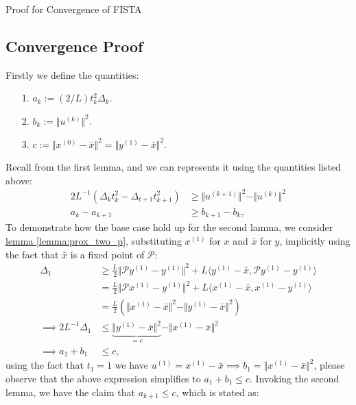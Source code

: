 \documentclass[]{article}
\theoremstyle{definition}
\begin{document}
\begin{section}{Proof for Convergence of FISTA}
    \subsection{Convergence Proof}
        Firstly we define the quantities: 
        \begin{itemize}
            \item [1.] $a_k := (2/L)t_k^2 \Delta_k$.
            \item [2.] $b_k := \Vert u^{(k)}\Vert^2$.
            \item [3.] $c:= \Vert x^{(0)} - \bar x\Vert^2 = \Vert y^{(1)} - \bar x\Vert^2$. 
        \end{itemize}
        Recall from the first lemma, and we can represents it using the quantities listed above: 
        \begin{align*}
            2L^{-1}(\Delta_kt_k^2 - \Delta_{t + 1}t_{k + 1}^2) 
            &\ge 
            \Vert u^{(k + 1)}\Vert^2 - \Vert u^{(k)}\Vert^2
            \\
            a_k - a_{k + 1} &\ge 
            b_{k + 1} - b_k, 
        \end{align*}
        To demonstrate how the base case hold up for the second lamma, we consider \hyperref[lemma:prox_two_p]{lemma \ref*{lemma:prox_two_p}}, substituting $x^{(1)}$ for $x$ and $\bar x$ for $y$, implicitly using the fact that $\bar x$ is a fixed point of $\mathcal P$: 
        \begin{align*}
            \Delta_1& \ge 
            \frac{L}{2}\Vert \mathcal Py^{(1)} - y^{(1)}\Vert^2 + L 
            \langle y^{(1)} - \bar x, \mathcal P y^{(1)} - y^{(1)}\rangle
            \\
            & =
            \frac{L}{2}\Vert \mathcal P x^{(1)} - y^{(1)}\Vert^2 + L 
            \langle x^{(1)} - \bar x, x^{(1)} - y^{(1)}\rangle
            \\
            &= 
            \frac{L}{2}
            (\Vert x^{(1)} - \bar x\Vert^2 - \Vert y^{(1)} - \bar x\Vert^2)
            \\
            \implies
            2L^{-1}\Delta_1 
            &\le
            \underbrace{\Vert y^{(1)} - \bar x\Vert^2}_{=c} - \Vert x^{(1)} - \bar x\Vert^2
            \\
            \implies
            a_1 + b_1
            & \le c, 
        \end{align*}
        using the fact that $t_1 = 1$ we have $u^{(1)} = x^{(1)} - \bar x \implies b_1 = \Vert x^{(1)} - \bar x\Vert^2$, please observe that the above expression simplifies to $a_1 + b_1 \le c$. Invoking the second lemma, we have the claim that $a_{k + 1}\le c$, which is stated as: 

\end{section}
\end{document}
